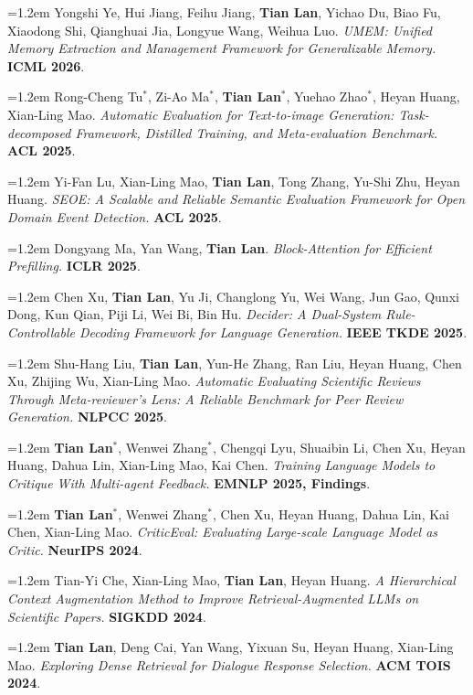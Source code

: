 \documentclass[10.5pt]{article}
\newcommand{\pubitem}[1]{\par\noindent\hangindent=1.2em\hangafter=1 #1\par\vspace{4pt}}
\newcommand{\venue}[1]{\textbf{\color{accent}#1}}
\begin{document}
\pubitem{Yongshi Ye, Hui Jiang, Feihu Jiang, \textbf{Tian Lan}, Yichao Du, Biao Fu, Xiaodong Shi, Qianghuai Jia, Longyue Wang, Weihua Luo. \textit{UMEM: Unified Memory Extraction and Management Framework for Generalizable Memory.} \venue{ICML 2026}.}

\pubitem{Rong-Cheng Tu$^{*}$, Zi-Ao Ma$^{*}$, \textbf{Tian Lan}$^{*}$, Yuehao Zhao$^{*}$, Heyan Huang, Xian-Ling Mao. \textit{Automatic Evaluation for Text-to-image Generation: Task-decomposed Framework, Distilled Training, and Meta-evaluation Benchmark.} \venue{ACL 2025}.}

\pubitem{Yi-Fan Lu, Xian-Ling Mao, \textbf{Tian Lan}, Tong Zhang, Yu-Shi Zhu, Heyan Huang. \textit{SEOE: A Scalable and Reliable Semantic Evaluation Framework for Open Domain Event Detection.} \venue{ACL 2025}.}

\pubitem{Dongyang Ma, Yan Wang, \textbf{Tian Lan}. \textit{Block-Attention for Efficient Prefilling.} \venue{ICLR 2025}.}

\pubitem{Chen Xu, \textbf{Tian Lan}, Yu Ji, Changlong Yu, Wei Wang, Jun Gao, Qunxi Dong, Kun Qian, Piji Li, Wei Bi, Bin Hu. \textit{Decider: A Dual-System Rule-Controllable Decoding Framework for Language Generation.} \venue{IEEE TKDE 2025}.}

\pubitem{Shu-Hang Liu, \textbf{Tian Lan}, Yun-He Zhang, Ran Liu, Heyan Huang, Chen Xu, Zhijing Wu, Xian-Ling Mao. \textit{Automatic Evaluating Scientific Reviews Through Meta-reviewer's Lens: A Reliable Benchmark for Peer Review Generation.} \venue{NLPCC 2025}.}

\pubitem{\textbf{Tian Lan}$^{*}$, Wenwei Zhang$^{*}$, Chengqi Lyu, Shuaibin Li, Chen Xu, Heyan Huang, Dahua Lin, Xian-Ling Mao, Kai Chen. \textit{Training Language Models to Critique With Multi-agent Feedback.} \venue{EMNLP 2025, Findings}.}

\pubitem{\textbf{Tian Lan}$^{*}$, Wenwei Zhang$^{*}$, Chen Xu, Heyan Huang, Dahua Lin, Kai Chen, Xian-Ling Mao. \textit{CriticEval: Evaluating Large-scale Language Model as Critic.} \venue{NeurIPS 2024}.}

\pubitem{Tian-Yi Che, Xian-Ling Mao, \textbf{Tian Lan}, Heyan Huang. \textit{A Hierarchical Context Augmentation Method to Improve Retrieval-Augmented LLMs on Scientific Papers.} \venue{SIGKDD 2024}.}

\pubitem{\textbf{Tian Lan}, Deng Cai, Yan Wang, Yixuan Su, Heyan Huang, Xian-Ling Mao. \textit{Exploring Dense Retrieval for Dialogue Response Selection.} \venue{ACM TOIS 2024}.}
\end{document}
